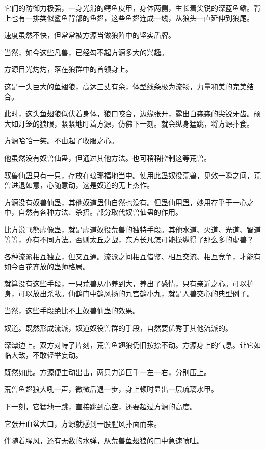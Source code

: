 \begin{this_body}
它们的防御力极强，一身光滑的鳄鱼皮甲，身体两侧，生长着尖锐的深蓝鱼鳍。背上也有一排类似鲨鱼背部的鱼翅，这些鱼翅连成一线，从狼头一直延伸到狼尾。

速度虽然不快，但常常被方源当做狼阵中的坚实盾牌。

当然，如今这些凡兽，已经勾不起方源多大的兴趣。

方源目光灼灼，落在狼群中的首领身上。

这是一头巨大的鱼翅狼，高达三丈有余，体型线条极为流畅，力量和美的完美结合。

此时，这头鱼翅狼低伏着身体，狼口咬合，边缘张开，露出白森森的尖锐牙齿。硕大如灯笼的狼眼，紧紧地盯着方源，仿佛下一刻。就会纵身猛跳，将方源扑食。

方源哈哈一笑。不由起了收服之心。

他虽然没有奴兽仙蛊，但通过其他方法。也可稍稍控制这等荒兽。

驭兽仙蛊只有一只，存放在琅琊福地当中。使用此蛊奴役荒兽，见效一瞬之间，荒兽进退如意，心随意动，这是奴道的无上杰作。

方源没有奴兽仙蛊，其他奴道蛊仙自然也没有。但蛊仙用蛊，妙用存乎于一心之中，自然有各种方法、杀招。部分取代奴兽仙蛊的作用。

比方说飞熊虚像蛊，就是虚道奴役荒兽的独特手段。其他水道、火道、光道、智道等等，亦有不同方法。否则太丘之战，东方长凡怎可能操纵得了那么多的虚兽？

各种流派相互独立，但又互通。流派之间相互借鉴、相互交流、相互竞争，才能有如今百花齐放的蛊师格局。

就算没有这些手段，一只荒兽从小养到大，养出了感情，只有亲近之心。可以护身，可以放出杀敌。仙鹤门中鹤风扬的九宫鹤小九，就是人兽交心的典型例子。

当然，这些手段绝比不上奴兽仙蛊的效果。

奴道。既然形成流派，奴道奴役兽群的手段，自然要优秀于其他流派的。

深潭边上。双方对峙了片刻，荒兽鱼翅狼仍旧按捺不动。方源身上的气息。让它如临大敌，不敢轻举妄动。

既然如此。方源便主动出击，两只力道巨手一左一右，分别压上。

荒兽鱼翅狼大吼一声，微微后退一步，身上顿时显出一层琉璃水甲。

下一刻，它猛地一跳，直接跳到高空，还要超过方源的高度。

它张开血盆大口，方源就感到一股腥风扑面而来。

伴随着腥风，还有无数的水弹，从荒兽鱼翅狼的口中急速喷吐。


\end{this_body}
